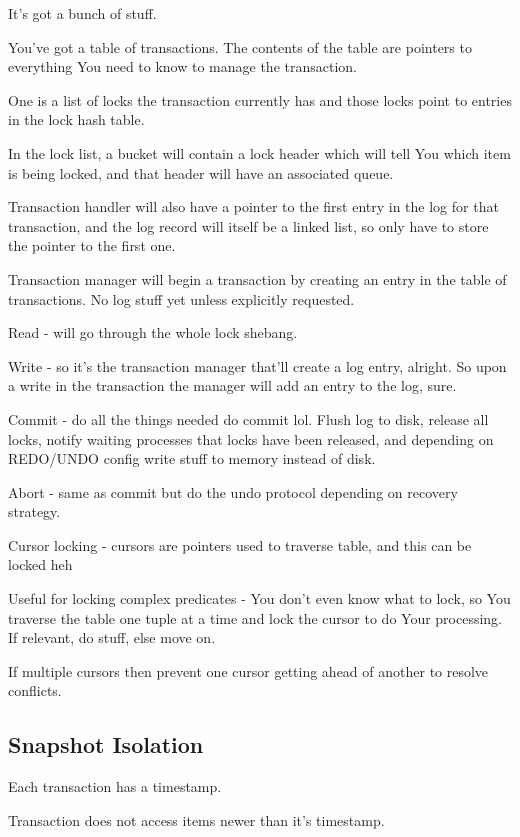 \documentclass{article}
\begin{document}
		It's got a bunch of stuff.
		
		You've got a table of transactions. The contents of the table are pointers to everything You need to know to manage the transaction.
		
		One is a list of locks the transaction currently has and those locks point to entries in the lock hash table.
		
		In the lock list, a bucket will contain a lock header which will tell You which item is being locked, and that header will have an associated queue. 
		
		Transaction handler will also have a pointer to the first entry in the log for that transaction, and the log record will itself be a linked list, so only have to store the pointer to the first one.
		
		Transaction manager will begin a transaction by creating an entry in the table of transactions. No log stuff yet unless explicitly requested.
		
		Read - will go through the whole lock shebang.
		
		Write - so it's the transaction manager that'll create a log entry, alright. So upon a write in the transaction the manager will add an entry to the log, sure. 
		
		Commit - do all the things needed do commit lol. Flush log to disk, release all locks, notify waiting processes that locks have been released, and depending on REDO/UNDO config write stuff to memory instead of disk.
		
		Abort - same as commit but do the undo protocol depending on recovery strategy.
		
		Cursor locking - cursors are pointers used to traverse table, and this can be locked heh
		
		Useful for locking complex predicates - You don't even know what to lock, so You traverse the table one tuple at a time and lock the cursor to do Your processing. If relevant, do stuff, else move on.
		
		If multiple cursors then prevent one cursor getting ahead of another to resolve conflicts.
		
	\subsection{Snapshot Isolation}
	
		Each transaction has a timestamp.
		
		Transaction does not access items newer than it's timestamp.
		
\end{document}
